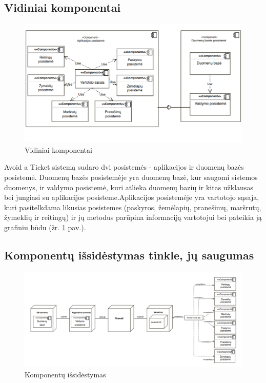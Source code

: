 \documentclass{VUMIFPSkursinis}
\begin{document}
\subsection{Vidiniai komponentai}

\begin{figure}[H]
	\centering
	\includegraphics[scale=0.7]{img/Vidiniai_komponentai}
	\caption{Vidiniai komponentai}
	\label{img:Vidiniai komponentai}
\end{figure}

Avoid a Ticket sistemą sudaro dvi posistemės - aplikacijos ir duomenų bazės posistemė. Duomenų bazės posistemėje yra duomenų bazė, kur saugomi sistemos duomenys, ir valdymo posistemė, kuri atlieka duomenų bazių ir kitas užklausas bei jungiasi su aplikacijos posisteme.Aplikacijos posistemėje yra vartotojo sąsaja, kuri pasitelkdama likusias posistemes (paskyros, žemėlapių, pranešimų, maršrutų, žymeklių ir reitingų) ir jų metodus parūpina informaciją vartotojui bei pateikia ją grafiniu būdu (žr. \ref{img:Vidiniai komponentai} pav.).

\subsection{Komponentų išsidėstymas tinkle, jų saugumas}

\begin{figure}[H]
	\centering
	\includegraphics[scale=0.4]{img/Komponentu_issidestymas}
	\caption{Komponentų išsidėstymas}
	\label{img:išsidėstymas}
\end{figure}
\end{document}
